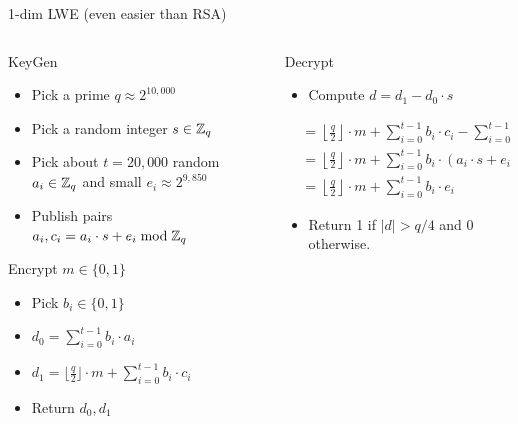 \documentclass[xcolor=table,10pt,aspectratio=169]{beamer}
\begin{document}
\begin{frame}[label={sec:org06ee4ce}]{1-dim LWE (even easier than RSA)}
\begin{columns}[t]
\begin{column}{0.4\columnwidth}
\alert{KeyGen}

\begin{itemize}
\item Pick a prime \(q \approx 2^{10,000}\)
\item Pick a random integer \(s \in \mathbb{Z}_q\)
\item Pick about \(t=20,000\) random \(a_i \in \mathbb{Z}_q\) and small \(e_i \approx 2^{9,850}\)
\item Publish pairs \(a_i, c_i = a_i \cdot s + e_i \bmod \mathbb{Z}_q\)
\end{itemize}

\alert{Encrypt}  \(m \in \{0,1\}\)

\begin{itemize}
\item Pick \(b_i \in \{0,1\}\)
\item \(d_0 = \sum_{i=0}^{t-1} b_i \cdot a_i\)
\item \(d_1 = \lfloor \frac{q}{2} \rfloor \cdot m + \sum_{i=0}^{t-1} b_i \cdot c_i\)
\item Return \(d_0, d_1\)
\end{itemize}
\end{column}
\begin{column}{0.6\columnwidth}
\alert{Decrypt}

\begin{itemize}
\item Compute \(d = d_1 - d_0 \cdot s\)
\end{itemize}
\begin{align*}
  &=  \left\lfloor \frac{q}{2} \right\rfloor \cdot m + \sum_{i=0}^{t-1} b_i \cdot c_i - \sum_{i=0}^{t-1} b_i \cdot a_i \cdot s\\
  &=  \left\lfloor \frac{q}{2} \right\rfloor \cdot m + \sum_{i=0}^{t-1} b_i \cdot (a_i \cdot s + e_i) - \sum_{i=0}^{t-1} b_i \cdot a_i \cdot s\\
  &=  \left\lfloor \frac{q}{2} \right\rfloor \cdot m + \sum_{i=0}^{t-1} b_i \cdot  e_i 
\end{align*}
\begin{itemize}
\item Return 1 if \(|d| > q/4\) and 0 otherwise.
\end{itemize}
\end{column}
\end{columns}
\end{frame}
\end{document}
